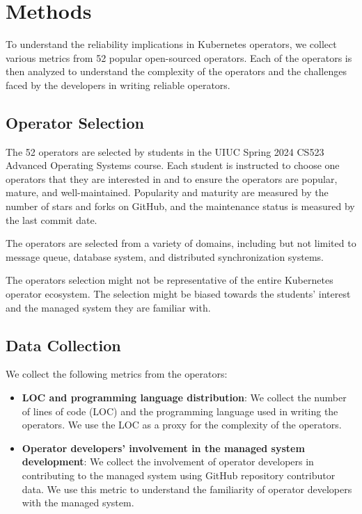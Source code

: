 \section{Methods}
To understand the reliability implications in Kubernetes operators, we collect
various metrics from 52 popular open-sourced operators. Each of the operators
is then analyzed to understand the complexity of the operators and the
challenges faced by the developers in writing reliable operators.

\subsection{Operator Selection}
The 52 operators are selected by students in the UIUC Spring 2024 CS523
Advanced Operating Systems course. Each student is instructed to choose one
operators that they are interested in and to ensure the operators are popular,
mature, and well-maintained. Popularity and maturity are measured by the number
of stars and forks on GitHub, and the maintenance status is measured by the last
commit date.

The operators are selected from a variety of domains, including but not limited
to message queue, database system, and distributed synchronization systems.

The operators selection might not be representative of the entire Kubernetes
operator ecosystem. The selection might be biased towards the students' interest
and the managed system they are familiar with.

\subsection{Data Collection}
We collect the following metrics from the operators:

\begin{itemize}
  \item \textbf{LOC and programming language distribution}: We collect the
        number of lines of code (LOC) and the programming language used in
        writing the operators. We use the LOC as a proxy for the complexity of
        the operators.
  \item \textbf{Operator developers' involvement in the managed system
          development}: We collect the involvement of operator developers in
        contributing to the managed system using GitHub repository contributor
        data. We use this metric to understand the familiarity of operator
        developers with the managed system.
\end{itemize}
